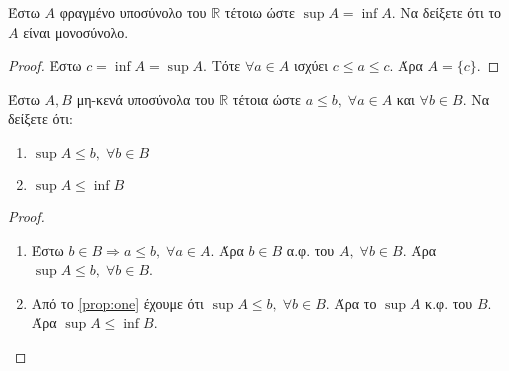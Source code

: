 \begin{multicols}{2}
\begin{enumerate}
    \item \textcolor{Col1}{Έστω $A$ φραγμένο υποσύνολο του $ \mathbb{R} $ τέτοιω ώστε 
      $ \sup A = \inf A $.  Να δείξετε ότι το $A$ είναι μονοσύνολο.}
      \begin{proof}
        Έστω $ c = \inf A = \sup A $. Τότε $ \forall a \in A $ ισχύει $ c \leq a \leq c
        $. Άρα $ A = \{ c \} $.
      \end{proof}

    \item \textcolor{Col1}{Έστω $ A, B $ μη-κενά υποσύνολα του $ \mathbb{R} $ 
        τέτοια ώστε $ a \leq b, \; \forall a \in A $ και $ \forall b \in B $.
        Να δείξετε ότι:
        \begin{enumerate}
          \item $ \sup A \leq b, \;  \forall b \in B $
          \item $ \sup A \leq \inf B $
      \end{enumerate}}
      \begin{proof}
      \item {}
        \begin{enumerate}
          \item \label{prop:one} Έστω $ b \in B \Rightarrow a \leq b, \; 
            \forall a \in A $. 
            Άρα $ b \in B $ α.φ. του $A, \; \forall b \in B$. Άρα 
            $ \sup A \leq b, \; \forall b \in B $.
          \item Από το \ref{prop:one} έχουμε ότι $ \sup A \leq b, \; \forall 
            b \in B$. Άρα το $ \sup A $ κ.φ. του $B$. Άρα $ \sup A \leq 
            \inf B$.
        \end{enumerate}
      \end{proof}


\end{enumerate}
\end{multicols}
